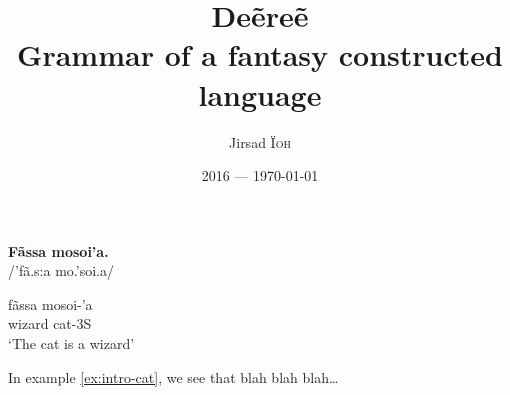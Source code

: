\documentclass[a4paper, oneside]{book}
\title{Deẽreẽ\\Grammar of a fantasy constructed language}
\author{Jirsad \textsc{Ïoh}}
\date{2016 — \today}
\begin{document}
\frontmatter
\maketitle
\tableofcontents
{}
\begin{exe}
\ex\label{ex:intro-cat}
\textbf{Fãssa mosoi’a.}\\
/'fã.s:a mo.'soi.a/

\gll fãssa mosoi-’a\\
wizard cat-3S\\
\trans ‘The cat is a wizard’
\end{exe}

In example \ref{ex:intro-cat}, we see that blah blah blah…

\mainmatter
\label{chap:phonology}


\label{chap:morphology}


\label{chap:derivational-morphology}


\label{chap:morphosyntax}


\label{chap:syntax}


\appendix
{}


\backmatter
\clearpage\glsaddall
\begin{multicols}{2}\printglossaries\end{multicols}
\listoffigures{}
\listoftables{}
\listoftodos
\end{document}
